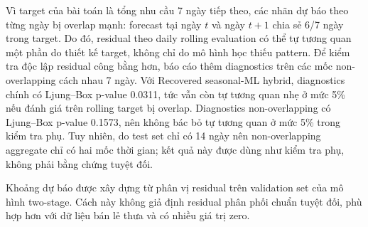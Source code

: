 \documentclass[12pt,a4paper]{article}
\begin{document}
Vì target của bài toán là tổng nhu cầu 7 ngày tiếp theo, các nhãn dự báo theo từng ngày bị overlap mạnh: forecast tại ngày $t$ và ngày $t+1$ chia sẻ 6/7 ngày trong target.
Do đó, residual theo daily rolling evaluation có thể tự tương quan một phần do thiết kế target, không chỉ do mô hình học thiếu pattern.
Để kiểm tra độc lập residual công bằng hơn, báo cáo thêm diagnostics trên các mốc non-overlapping cách nhau 7 ngày.
Với Recovered seasonal-ML hybrid, diagnostics chính có Ljung--Box p-value 0.0311, tức vẫn còn tự tương quan nhẹ ở mức 5\% nếu đánh giá trên rolling target bị overlap.
Diagnostics non-overlapping có Ljung--Box p-value 0.1573, nên không bác bỏ tự tương quan ở mức 5\% trong kiểm tra phụ.
Tuy nhiên, do test set chỉ có 14 ngày nên non-overlapping aggregate chỉ có hai mốc thời gian; kết quả này được dùng như kiểm tra phụ, không phải bằng chứng tuyệt đối.

\begin{table}[H]
\centering
\caption{Diagnostics trên non-overlapping 7-day targets}
\end{table}

Khoảng dự báo được xây dựng từ phân vị residual trên validation set của mô hình two-stage.
Cách này không giả định residual phân phối chuẩn tuyệt đối, phù hợp hơn với dữ liệu bán lẻ thưa và có nhiều giá trị zero.
\end{document}
